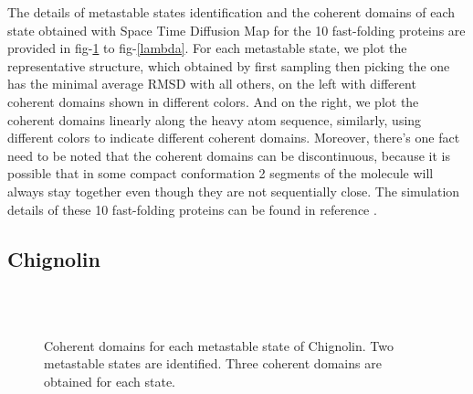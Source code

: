 \documentclass[12pt]{article}
\begin{document}
\setlength{\parindent}{2em}

The details of metastable states identification and the coherent domains of each state obtained with Space Time Diffusion Map for the 10 fast-folding proteins are provided in fig-\ref{CLN025} to fig-\ref{lambda}. For each metastable state, we plot the representative structure, which obtained by first sampling then picking the one has the minimal average RMSD with all others, on the left with different coherent domains shown in different colors. And on the right, we plot the coherent domains linearly along the heavy atom sequence, similarly, using different colors to indicate different coherent domains. Moreover, there's one fact need to be noted that the coherent domains can be discontinuous, because it is possible that in some compact conformation 2 segments of the molecule will always stay together even though they are not sequentially close. The simulation details of these 10 fast-folding proteins can be found in reference \cite{A3D_frustration}.

\subsection*{Chignolin}

\begin{figure}[htbp]
  \centering
  \\
  \\
  \caption{\label{CLN025}Coherent domains for each metastable state of Chignolin. Two metastable states are identified. Three coherent domains are obtained for each state.}
\end{figure}
\end{document}
